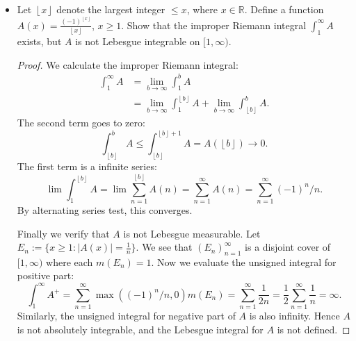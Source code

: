 \begin{itemize}
	\item Let $\left\lfloor x \right\rfloor$ denote the largest integer $\le x$, where $x \in \mathbb{R}$. Define a function $A(x) = \frac{(-1)^{\left\lfloor x \right\rfloor}}{\left\lfloor x \right\rfloor}$, $x \ge 1$. Show that the improper Riemann integral $\int _1^\infty A$ exists, but $A$ is not Lebesgue integrable on $[1, \infty )$.
\begin{proof}
	We calculate the improper Riemann integral:
	\begin{align*}
		\int _1^{\infty } A 
		&= \lim_{b \to \infty } \int _1^b A \\
		&= \lim_{b \to \infty }  \int _1^{\left\lfloor b \right\rfloor} A + \lim_{b \to \infty }\int _{\left\lfloor b \right\rfloor}^b A
	.\end{align*}
	The second term goes to zero:
	\[
		\int _{\left\lfloor b \right\rfloor}^b A\le \int _{\left\lfloor b \right\rfloor}^{\left\lfloor b \right\rfloor+1}A = A(\left\lfloor b \right\rfloor) \to 0
	.\] 
	The first term is a infinite series:
	\[
		 \lim \int _1^{\left\lfloor b \right\rfloor} A
		 =\lim \sum_{n=1}^{\left\lfloor b \right\rfloor} A(n)
		 = \sum_{n=1}^{\infty} A(n)
		 = \sum_{n=1}^{\infty} (-1)^{n}/n
	.\] 
	By alternating series test, this converges.

	Finally we verify that $A$ is not Lebesgue measurable. Let $E_n := \{x \ge 1: |A(x)| = \frac{1}{n}\} $. We see that $\left( E_n \right) _{n = 1}^{\infty }$ is a disjoint cover of $[1, \infty )$ where each $m(E_n) = 1$. Now we evaluate the unsigned integral for positive part:
	\[
		\int _1^{\infty }A^{+} = \sum_{n=1}^{\infty} \max( (-1)^{n}/n , 0) m(E_n) = \sum_{n=1}^{\infty} \frac{1}{2n} = \frac{1}{2} \sum_{n=1}^{\infty} \frac{1}{n} = \infty 
	.\] 
	Similarly, the unsigned integral for negative part of $A$ is also infinity. Hence
	$A$ is not absolutely integrable, and the Lebesgue integral for $A$ is not defined.
\end{proof}


\end{itemize}
